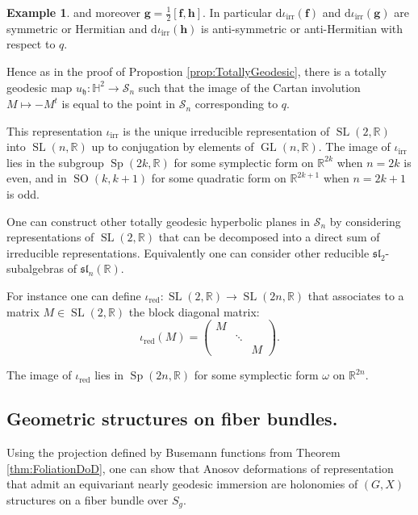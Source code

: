 \documentclass[reqno,10pt]{amsart}
\theoremstyle{plain}
\theoremstyle{definition}
\newtheorem{exmp}[thm]{Example}
\theoremstyle{remark}
\newcommand{\R}{\mathbb{R}}
\DeclareMathOperator{\SL}{SL}
\DeclareMathOperator{\GL}{GL}
\DeclareMathOperator{\SO}{SO}
\DeclareMathOperator{\Sp}{Sp}
\begin{document}
\begin{exmp}
and moreover $\mathbf{g}=\frac{1}{2}[\mathbf{f},\mathbf{h}]$. In particular $\mathrm{d}\iota_\text{irr}(\mathbf{f})$ and $\mathrm{d}\iota_\text{irr}(\mathbf{g})$ are symmetric or Hermitian and $\mathrm{d}\iota_\text{irr}(\mathbf{h})$ is anti-symmetric or anti-Hermitian with respect to $q$. 

\medskip

Hence as in the proof of Propostion \ref{prop:TotallyGeodesic}, there is a totally geodesic map $u_\mathfrak{h}:\mathbb{H}^2\to \mathcal{S}_n$ such that the image of the Cartan involution $M\mapsto -M^t$ is equal to the point in $\mathcal{S}_n$ corresponding to $q$. 

\medskip

This representation $\iota_\text{irr}$ is the unique irreducible representation of $\SL(2,\R)$ into $\SL(n,\R)$ up to conjugation by elements of $\GL(n,\R)$. The image of $\iota_\text{irr}$ lies in the subgroup $\Sp(2k,\R)$ for some symplectic form on $\R^{2k}$ when $n=2k$ is even, and in $\SO(k,k+1)$ for some quadratic form on $\R^{2k+1}$ when $n=2k+1$ is odd.

\bigskip

One can construct other totally geodesic hyperbolic planes in $\mathcal{S}_n$ by considering representations of $\SL(2,\R)$ that can be decomposed into a direct sum of irreducible representations. Equivalently one can consider other reducible $\mathfrak{sl}_2$-subalgebras of $\mathfrak{sl}_n(\R)$.

\medskip

 For instance one can define $\iota_\text{red}:\SL(2,\R)\to \SL(2n,\R)$ that associates to a matrix $M\in \SL(2,\R)$ the block diagonal matrix:
 $$\iota_\text{red}(M)=\begin{pmatrix}
M & &\\
 & \ddots&\\
 &&M
 \end{pmatrix} .$$ 
 

\medskip

The image of $\iota_\text{red}$ lies in $\Sp(2n,\R)$ for some symplectic form $\omega$ on $\R^{2n}$.

\end{exmp}

\subsection{Geometric structures on fiber bundles.}

Using the projection defined by Busemann functions from Theorem \ref{thm:FoliationDoD}, one can show that Anosov deformations of representation that admit an equivariant nearly geodesic immersion are holonomies of $(G,X)$ structures on a fiber bundle over $S_g$. 
\end{document}
